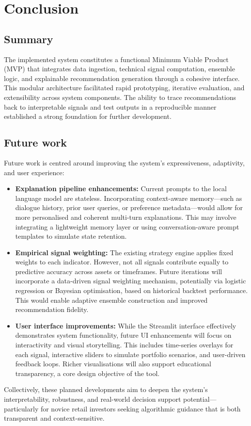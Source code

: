 \section{Conclusion}

\subsection{Summary}
The implemented system constitutes a functional Minimum Viable Product (MVP) that integrates data ingestion, technical signal computation, ensemble logic, and explainable recommendation generation through a cohesive interface. This modular architecture facilitated rapid prototyping, iterative evaluation, and extensibility across system components. The ability to trace recommendations back to interpretable signals and test outputs in a reproducible manner established a strong foundation for further development.

\subsection{Future work}
Future work is centred around improving the system’s expressiveness, adaptivity, and user experience:

\begin{itemize}
\item \textbf{Explanation pipeline enhancements:} Current prompts to the local language model are stateless. Incorporating context-aware memory—such as dialogue history, prior user queries, or preference metadata—would allow for more personalised and coherent multi-turn explanations. This may involve integrating a lightweight memory layer or using conversation-aware prompt templates to simulate state retention.
\item \textbf{Empirical signal weighting:} The existing strategy engine applies fixed weights to each indicator. However, not all signals contribute equally to predictive accuracy across assets or timeframes. Future iterations will incorporate a data-driven signal weighting mechanism, potentially via logistic regression or Bayesian optimisation, based on historical backtest performance. This would enable adaptive ensemble construction and improved recommendation fidelity.

\item \textbf{User interface improvements:} While the Streamlit interface effectively demonstrates system functionality, future UI enhancements will focus on interactivity and visual storytelling. This includes time-series overlays for each signal, interactive sliders to simulate portfolio scenarios, and user-driven feedback loops. Richer visualisations will also support educational transparency, a core design objective of the tool.
\end{itemize}

Collectively, these planned developments aim to deepen the system’s interpretability, robustness, and real-world decision support potential—particularly for novice retail investors seeking algorithmic guidance that is both transparent and context-sensitive.